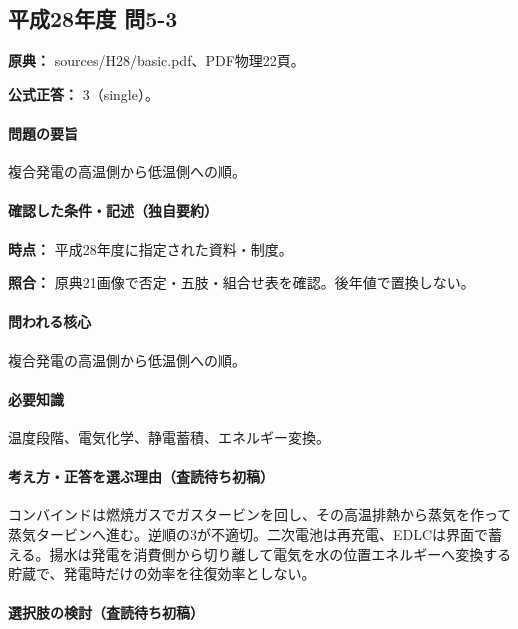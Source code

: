 \subsection{平成28年度 問5-3}
\label{q:h28-reg-basic-5-3}

\noindent\textbf{原典：} sources/H28/basic.pdf、PDF物理22頁。

\textbf{公式正答：} 3（single）。

\paragraph{問題の要旨} 複合発電の高温側から低温側への順。

\paragraph{確認した条件・記述（独自要約）}\mbox{}\par

\noindent\textbf{時点：} 平成28年度に指定された資料・制度。\par

\noindent\textbf{照合：} 原典21画像で否定・五肢・組合せ表を確認。後年値で置換しない。\par

\paragraph{問われる核心} 複合発電の高温側から低温側への順。

\paragraph{必要知識} 温度段階、電気化学、静電蓄積、エネルギー変換。

\paragraph{考え方・正答を選ぶ理由（査読待ち初稿）} コンバインドは燃焼ガスでガスタービンを回し、その高温排熱から蒸気を作って蒸気タービンへ進む。逆順の3が不適切。二次電池は再充電、EDLCは界面で蓄える。揚水は発電を消費側から切り離して電気を水の位置エネルギーへ変換する貯蔵で、発電時だけの効率を往復効率としない。

\paragraph{選択肢の検討（査読待ち初稿）}\mbox{}\par

